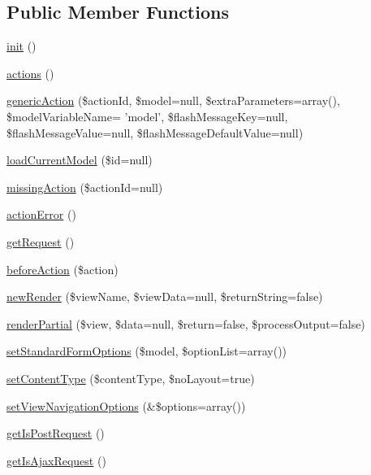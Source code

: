 \subsection*{Public Member Functions}
\begin{DoxyCompactItemize}
\item 
\hyperlink{classCXLController_a4be4055f3361d4800e16bc2e2e38cda6}{init} ()
\item 
\hyperlink{classCXLController_ae353790f09e1f72e1cc81d21a6eb9bed}{actions} ()
\item 
\hyperlink{classCXLController_ab9196d5e77e86dc16866c3b5373963a2}{genericAction} (\$actionId, \$model=null, \$extraParameters=array(), \$modelVariableName= 'model', \$flashMessageKey=null, \$flashMessageValue=null, \$flashMessageDefaultValue=null)
\item 
\hyperlink{classCXLController_aee989705ca23d787542be0bf30a28000}{loadCurrentModel} (\$id=null)
\item 
\hyperlink{classCXLController_a3d33455ae87de01aa0051c43be585ee7}{missingAction} (\$actionId=null)
\item 
\hyperlink{classCXLController_a8471fa2c95307d608c34f15dae47d254}{actionError} ()
\item 
\hyperlink{classCXLController_adf1a35ad20e475c59cc0967d5764aa22}{getRequest} ()
\item 
\hyperlink{classCXLController_ae348b4354879b012496b19989bf6d9cf}{beforeAction} (\$action)
\item 
\hyperlink{classCXLController_acaf53d84b70927098a40b8e626985146}{newRender} (\$viewName, \$viewData=null, \$returnString=false)
\item 
\hyperlink{classCXLController_a8324b095d3faa196d784f84a3f0cef25}{renderPartial} (\$view, \$data=null, \$return=false, \$processOutput=false)
\item 
\hyperlink{classCXLController_ae926a613a7702bb749e974f35a462d60}{setStandardFormOptions} (\$model, \$optionList=array())
\item 
\hyperlink{classCXLController_a136cf4fecb17df00146f6889ffdbccee}{setContentType} (\$contentType, \$noLayout=true)
\item 
\hyperlink{classCXLController_a592bdbc48efc56a00e5b49582db7c09f}{setViewNavigationOptions} (\&\$options=array())
\item 
\hyperlink{classCXLController_acea2c7c705d91ba736a41e67314e5ae3}{getIsPostRequest} ()
\item 
\hyperlink{classCXLController_aed1df55c262bb0238ae6ef0921a2552b}{getIsAjaxRequest} ()

\end{DoxyCompactItemize}
